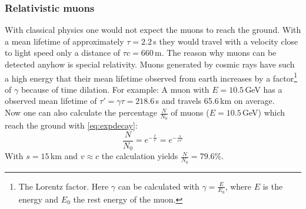 \subsubsection{Relativistic muons}
With classical physics one would not expect the muons to reach the ground. With a mean lifetime of approximately $\tau=2.2$\,\textmu s they would 
travel with a velocity close to light speed only a distance of  $\tau c = 660$\,m. The reason why muons can be detected anyhow is special relativity. Muons generated 
by cosmic rays have such a high energy that their mean lifetime observed from earth increases by a 
factor\footnote{The Lorentz factor. Here $\gamma$ can be calculated with $\gamma = \frac{E}{E_0}$, where $E$ is the energy and $E_0$ the rest energy of the muon.}  
of $\gamma$
because of time dilation. For example: A muon with $E=10.5$\,GeV has a observed mean lifetime of $\tau'=\gamma \tau=218.6$\,\textmu s and travels 65.6\,km on average. \\
Now one can also calculate the percentage $\frac{N}{N_0}$ of muons ($E=10.5$\,GeV) which reach the ground with \autoref{eq:expdecay}:
\begin{equation}
    \frac{N}{N_0} = e^{-\frac{t}{\tau'}} = e^{-\frac{s}{v\tau'}}
\end{equation}
With $s=15$\,km and $v \approx c$ the calculation yields $\frac{N}{N_0} = 79.6\%$.
